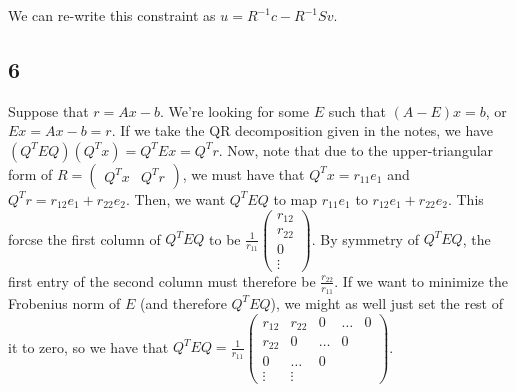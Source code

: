 \documentclass{article}
\newcommand{\openm}{\begin{pmatrix}}
\newcommand{\closem}{\end{pmatrix}}
\begin{document}
We can re-write this constraint as $u=R^{-1}c-R^{-1}Sv$. 
\subsection*{6}
Suppose that $r=Ax-b$. We're looking for some $E$ such that $(A-E)x=b$, or $Ex=Ax-b=r$. If we take the QR decomposition given in the notes, we have $(Q^TEQ)(Q^Tx)=Q^TEx=Q^Tr$. Now, note that due to the upper-triangular form of $R=\openm Q^Tx&Q^Tr\closem$, we must have that $Q^Tx=r_{11}e_1$ and $Q^Tr=r_{12}e_1+r_{22}e_2$. Then, we want $Q^TEQ$ to map $r_{11}e_1$ to $r_{12}e_1+r_{22}e_2$. This forcse the first column of $Q^TEQ$ to be $\frac{1}{r_{11}}\openm r_{12}\\r_{22}\\0\\\vdots\closem$. By symmetry of $Q^TEQ$, the first entry of the second column must therefore be $\frac{r_{22}}{r_{11}}$. If we want to minimize the Frobenius norm of $E$ (and therefore $Q^TEQ$), we might as well just set the rest of it to zero, so we have that $Q^TEQ=\frac{1}{r_{11}}\openm r_{12}&r_{22}&0&\hdots&0\\r_{22}&0&\hdots&0\\0&\hdots&0\\\vdots&\vdots\closem$.
\end{document}
